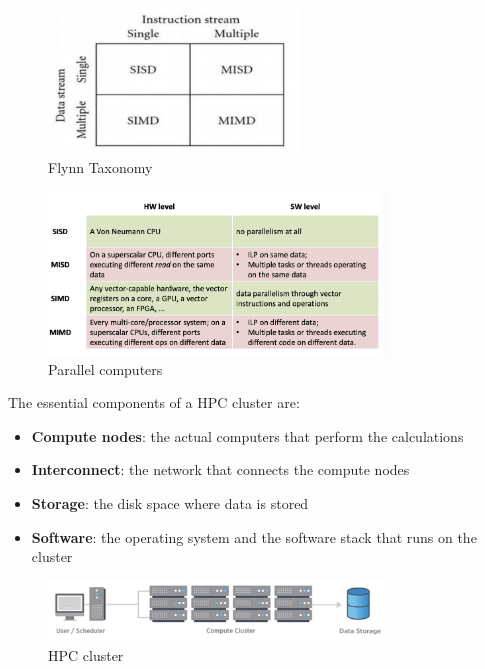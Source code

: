 \begin{figure}[H]
    \centering
    \includegraphics[width=0.6\textwidth]{assets/fig4.png}
    \caption{Flynn Taxonomy}
    \label{fig:flynn_taxonomy}
\end{figure}

\begin{figure}[H]
    \centering
    \includegraphics[width=0.8\textwidth]{assets/fig5.png}
    \caption{Parallel computers}
    \label{fig:parallel_computers}
\end{figure}

The essential components of a HPC cluster are:
\begin{itemize}
    \item \textbf{Compute nodes}: the actual computers that perform the calculations
    \item \textbf{Interconnect}: the network that connects the compute nodes
    \item \textbf{Storage}: the disk space where data is stored
    \item \textbf{Software}: the operating system and the software stack that runs on the cluster
\end{itemize}

\begin{figure}[H]
    \centering
    \includegraphics[width=0.8\textwidth]{assets/fig6.png}
    \caption{HPC cluster}
    \label{fig:hpc_cluster}
\end{figure}

